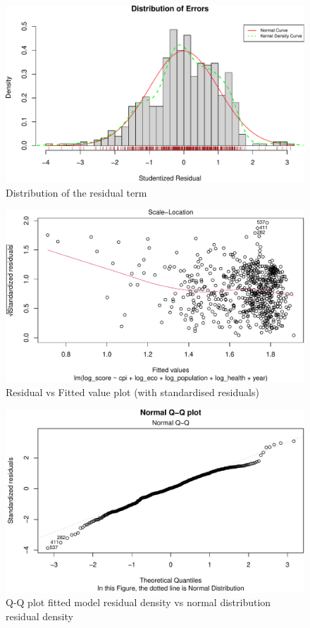 \documentclass[11pt,a4paper,]{article}
\begin{document}
\begin{figure}
\centering
\includegraphics{Assignment4_files/figure-latex/density-1.pdf}
\caption{\label{fig:density}Distribution of the residual term}
\end{figure}

\begin{figure}
\centering
\includegraphics{Assignment4_files/figure-latex/resd-1.pdf}
\caption{\label{fig:resd}Residual vs Fitted value plot (with standardised residuals)}
\end{figure}

\begin{figure}
\centering
\includegraphics{Assignment4_files/figure-latex/qq-1.pdf}
\caption{\label{fig:qq}Q-Q plot fitted model residual density vs normal distribution residual density}
\end{figure}
\end{document}

